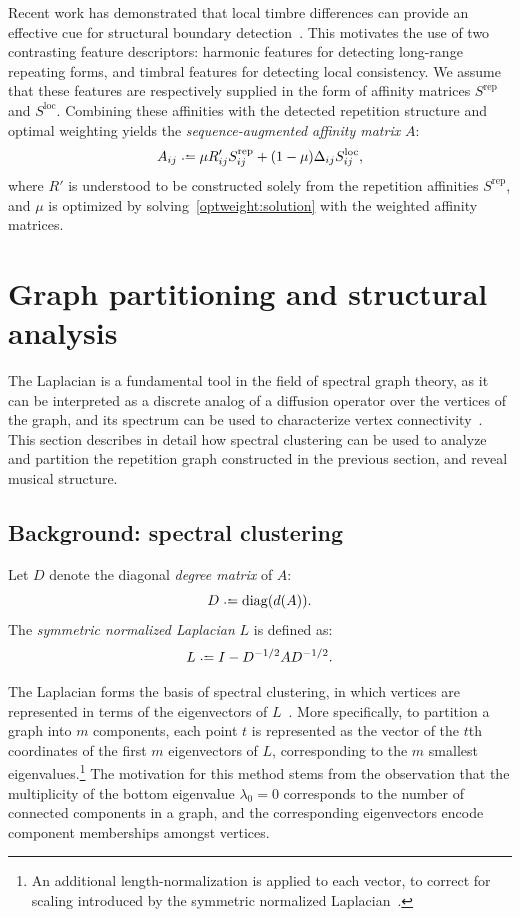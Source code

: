 \documentclass{article}
\begin{document}
Recent work has demonstrated that local timbre differences 
can provide an effective cue for structural boundary
detection~\cite{kaiser2013simple}.  This motivates the use of two contrasting feature
descriptors: harmonic features for detecting long-range repeating forms, and timbral
features for detecting local consistency.  We assume that these features are
respectively supplied in the form of affinity matrices $S^\text{rep}$ and
$S^\text{loc}$.  Combining these affinities with the detected repetition structure and
optimal weighting yields the \emph{sequence-augmented affinity matrix} $A$:
\begin{equation}
A_{ij} \defeq \mu R'_{ij} S^\text{rep}_{ij} + (1-\mu) \Delta_{ij} S^\text{loc}_{ij},\label{saam}
\end{equation}
where $R'$ is understood to be
constructed solely from the repetition affinities $S^\text{rep}$, and $\mu$ is
optimized by solving~\eqref{optweight:solution} with the weighted affinity matrices.


\section{Graph partitioning and structural analysis}

The Laplacian is a fundamental tool in the field of spectral graph
theory, as it can be interpreted as a discrete analog of a diffusion operator over the
vertices of the graph, and its spectrum can be used to characterize 
vertex connectivity~\cite{chung1997spectral}.  This section describes in detail
how spectral clustering can be used to analyze and partition the repetition graph 
constructed in the previous section, and reveal musical structure.

\subsection{Background: spectral clustering}
Let $D$ denote the diagonal \emph{degree matrix} of $A$: 
$${D \defeq \diag(d(A))}.$$
The \emph{symmetric normalized Laplacian} $L$ is defined as:
\begin{equation}
L \defeq I - D^{-1/2} A D^{-1/2}.\label{symlaplacian}
\end{equation}

The Laplacian forms the basis of spectral clustering, in which vertices are
represented in terms of the eigenvectors of $L$~\cite{von2007tutorial}.  More
specifically, to partition a graph into $m$ components, each point $t$ is represented as
the vector of the $t$th coordinates of the first $m$ eigenvectors of $L$,
corresponding to the $m$ smallest eigenvalues.\footnote{An additional
length-normalization is applied to each vector, to correct for scaling introduced by
the symmetric normalized Laplacian~\cite{von2007tutorial}.}
The motivation for this method stems from the observation that the multiplicity of the 
bottom eigenvalue $\lambda_0 = 0$ corresponds to the number of connected components in a
graph, and the corresponding eigenvectors encode component memberships amongst vertices.
\end{document}
